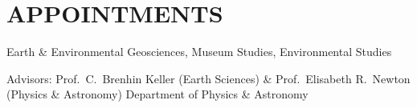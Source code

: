 \section{APPOINTMENTS}

Earth \& Environmental Geosciences, Museum Studies, Environmental Studies


Advisors: Prof.~C.~Brenhin Keller (Earth Sciences) \& Prof.~Elisabeth R.~Newton (Physics \& Astronomy)
Department of Physics \& Astronomy




